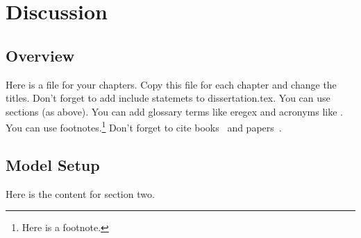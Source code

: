  
\chapter{Discussion}
\resetfootnote %

\section{Overview}

Here is a file for your chapters.  Copy this file for each chapter 
and change the titles.  Don't forget to add include statemets to 
dissertation.tex.  
You can use sections (as above).  
You can add glossary terms like \gls{eregex} and acronyms like .
You can use footnotes.\footnote{Here is a footnote.}
Don't forget to cite books~\cite{Sipser} and papers~\cite{CarleNarendran}.

\section{Model Setup}

Here is the content for section two.
